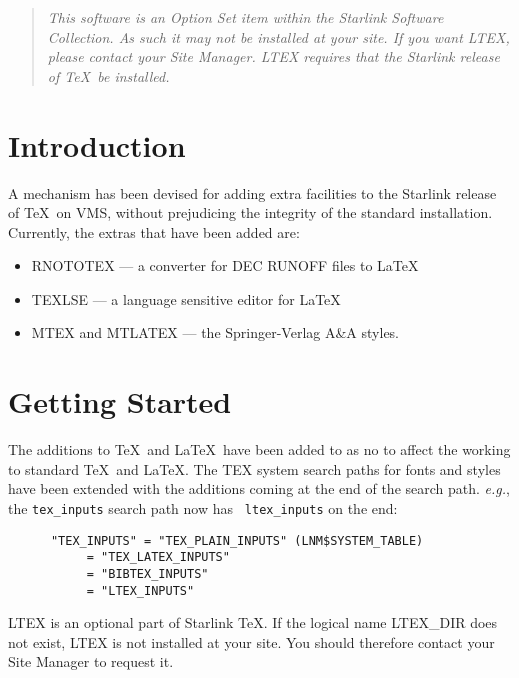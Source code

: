\begin{quote}\em
This software is an Option Set item within the Starlink Software Collection.
As such it may not be installed at your site. If you want LTEX, please contact
your Site Manager. LTEX requires that the Starlink release of \TeX\ be
installed.
\end{quote}

\vfill

\newpage

\section{Introduction}
\label{se:intro}

A mechanism has been devised for adding extra facilities to the Starlink release
of \TeX\ on VMS, without prejudicing the integrity of the standard
installation. Currently, the extras that have been added are:

\begin{itemize}

\item RNOTOTEX --- a converter for DEC RUNOFF files to \LaTeX

\item TEXLSE --- a language sensitive editor for \LaTeX

\item MTEX and MTLATEX --- the Springer-Verlag A\&A styles.

\end{itemize}

\section{Getting Started}
\label{se:gtg}

The additions to \TeX\ and \LaTeX\ have been added to as no to affect the
working to standard \TeX\ and \LaTeX . The TEX system search paths for fonts
and styles have been extended with the additions coming at the end of the
search path. {\em e.g.}, the {\tt tex\_inputs} search path now has {\tt
ltex\_inputs} on the end:

\begin{verbatim}
      "TEX_INPUTS" = "TEX_PLAIN_INPUTS" (LNM$SYSTEM_TABLE)
           = "TEX_LATEX_INPUTS"
           = "BIBTEX_INPUTS"
           = "LTEX_INPUTS"
\end{verbatim}

LTEX is an optional part of Starlink \TeX . If the logical name LTEX\_DIR does
not exist, LTEX is not installed at your site. You should therefore contact
your Site Manager to request it.

